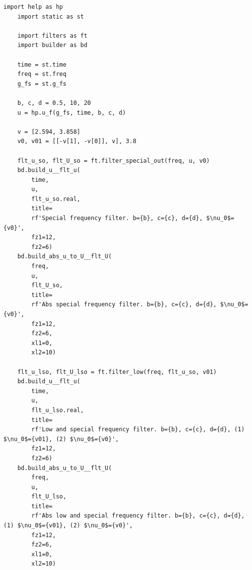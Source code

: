 \documentclass[a4paper, 12pt]{article}
\begin{document}
    \begin{lstlisting}[label=l7, caption={Файл nospec.py. Фильтрация специфических частот}]
    import help as hp
    import static as st

    import filters as ft
    import builder as bd

    time = st.time
    freq = st.freq
    g_fs = st.g_fs

    b, c, d = 0.5, 10, 20
    u = hp.u_f(g_fs, time, b, c, d)

    v = [2.594, 3.858]
    v0, v01 = [[-v[1], -v[0]], v], 3.8

    flt_u_so, flt_U_so = ft.filter_special_out(freq, u, v0)
    bd.build_u__flt_u(
        time,
        u,
        flt_u_so.real,
        title=
        rf'Special frequency filter. b={b}, c={c}, d={d}, $\nu_0$={v0}',
        fz1=12,
        fz2=6)
    bd.build_abs_u_to_U__flt_U(
        freq,
        u,
        flt_U_so,
        title=
        rf'Abs special frequency filter. b={b}, c={c}, d={d}, $\nu_0$={v0}',
        fz1=12,
        fz2=6,
        xl1=0,
        xl2=10)

    flt_u_lso, flt_U_lso = ft.filter_low(freq, flt_u_so, v01)
    bd.build_u__flt_u(
        time,
        u,
        flt_u_lso.real,
        title=
        rf'Low and special frequency filter. b={b}, c={c}, d={d}, (1) $\nu_0$={v01}, (2) $\nu_0$={v0}',
        fz1=12,
        fz2=6)
    bd.build_abs_u_to_U__flt_U(
        freq,
        u,
        flt_U_lso,
        title=
        rf'Abs low and special frequency filter. b={b}, c={c}, d={d}, (1) $\nu_0$={v01}, (2) $\nu_0$={v0}',
        fz1=12,
        fz2=6,
        xl1=0,
        xl2=10)
    \end{lstlisting}
\end{document}
